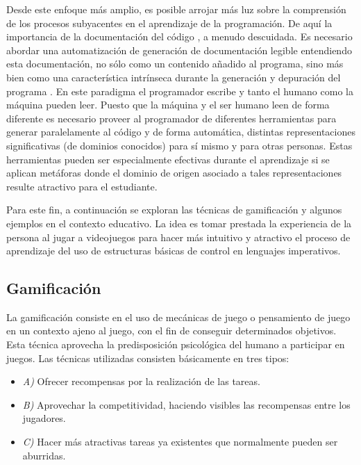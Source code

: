 \documentclass{llncs}
\begin{document}
Desde este enfoque más amplio, es posible arrojar más luz sobre la comprensión de los procesos subyacentes en el aprendizaje de la programación. De aquí la importancia de la documentación del código \cite{tenny1988program}, a menudo descuidada. Es necesario abordar una automatización de generación de documentación legible entendiendo esta documentación, no sólo como un contenido añadido al programa, sino más bien como una característica intrínseca durante la generación y depuración del programa \cite{baecker1988enhancing}. En este paradigma el programador escribe y tanto el humano como la máquina pueden leer. Puesto que la máquina y el ser humano leen de forma diferente es necesario proveer al programador de diferentes herramientas para generar paralelamente al código y de forma automática, distintas representaciones significativas (de dominios conocidos) para sí mismo y para otras personas. Estas herramientas pueden ser especialmente efectivas durante el aprendizaje si se aplican metáforas donde el dominio de origen asociado a tales representaciones resulte atractivo para el estudiante.

Para este fin, a continuación se exploran las técnicas de gamificación y algunos ejemplos en el contexto educativo. La idea es tomar prestada la experiencia de la persona al jugar a videojuegos para hacer más intuitivo y atractivo el proceso de aprendizaje del uso de estructuras básicas de control en lenguajes imperativos. 


\subsection{Gamificación}
\label{subsec:gamification}

La gamificación consiste en el uso de mecánicas de juego o pensamiento de juego en un contexto ajeno al juego, con el fin de conseguir determinados objetivos. Esta técnica aprovecha la predisposición psicológica del humano a participar en juegos. Las técnicas utilizadas consisten básicamente en tres tipos:
\begin{itemize}
\item {\em A)} Ofrecer recompensas por la realización de las tareas. 
\item {\em B)} Aprovechar la competitividad, haciendo visibles las recompensas entre los jugadores.
\item {\em C)} Hacer más atractivas tareas ya existentes que normalmente pueden ser aburridas. 
\end{itemize}
\end{document}
